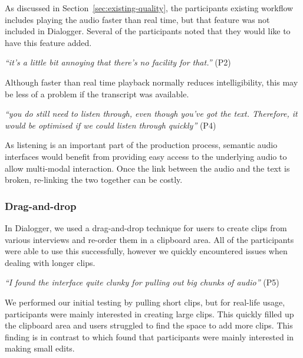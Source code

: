 As discussed in Section~\ref{sec:existing-quality}, the participants existing workflow includes playing the audio
faster than real time, but that feature was not included in Dialogger.  Several of the participants noted that they
would like to have this feature added.

\textit{``it's a little bit annoying that there's no facility for that.''} (P2)

Although faster than real time playback normally reduces intelligibility, this may be less of a problem if the
transcript was available.

\textit{``you do still need to listen through, even though you've got the text.  Therefore, it would be optimised if we
  could listen through quickly''} (P4)

As listening is an important part of the production process, semantic audio interfaces would benefit from providing
easy access to the underlying audio to allow multi-modal interaction. Once the link between the audio and the text is
broken, re-linking the two together can be costly.



\subsubsection{Drag-and-drop}

In Dialogger, we used a drag-and-drop technique for users to create clips from various interviews and
re-order them in a clipboard area. All of the participants were able to use this successfully, however we quickly
encountered issues when dealing with longer clips.

\textit{``I found the interface quite clunky for pulling out big chunks of audio''} (P5)

We performed our initial testing by pulling short clips, but for real-life usage, participants were mainly interested
in creating large clips. This quickly filled up the clipboard area and users struggled to find the space to add more
clips. This finding is in contrast to \citet{Sivaraman2016} which found that participants were mainly interested in
making small edits.

